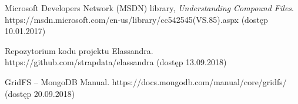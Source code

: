 \begin{thebibliography}{54}

	Microsoft Developers Network (MSDN) library,
	\emph{Understanding Compound Files}.
    https://msdn.microsoft.com/en-us/library/cc542545(VS.85).aspx (dostęp 10.01.2017)
    
 Repozytorium kodu projektu Elassandra.
https://github.com/strapdata/elassandra (dostęp 13.09.2018)

 GridFS -- MongoDB Manual. https://docs.mongodb.com/manual/core/gridfs/ (dostęp 20.09.2018)
    
\end{thebibliography}